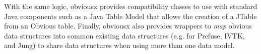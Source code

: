 With the same logic, obviousx provides compatibility classes to use
with standard Java components such as a Java Table Model that allows
the creation of a JTable from an Obvious table.  Finally, obviousx
also provides wrappers to \emph{map} obvious data structures into
common existing data structures (e.g. for Prefuse, IVTK, and Jung) to share data structures when using more than one
data model.

